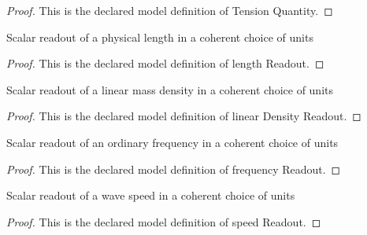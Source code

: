\begin{proof}
  This is the declared model definition of Tension Quantity.
\end{proof}
\begin{definition}
  \label{def:physics:phyx-mini-0182:phyxminiproblems-problemphyxmini0182-lengthreadout}
  Scalar readout of a physical length in a coherent choice of units
\end{definition}
\begin{proof}
  This is the declared model definition of length Readout.
\end{proof}
\begin{definition}
  \label{def:physics:phyx-mini-0182:phyxminiproblems-problemphyxmini0182-lineardensityreadout}
  Scalar readout of a linear mass density in a coherent choice of units
\end{definition}
\begin{proof}
  This is the declared model definition of linear Density Readout.
\end{proof}
\begin{definition}
  \label{def:physics:phyx-mini-0182:phyxminiproblems-problemphyxmini0182-frequencyreadout}
  Scalar readout of an ordinary frequency in a coherent choice of units
\end{definition}
\begin{proof}
  This is the declared model definition of frequency Readout.
\end{proof}
\begin{definition}
  \label{def:physics:phyx-mini-0182:phyxminiproblems-problemphyxmini0182-speedreadout}
  Scalar readout of a wave speed in a coherent choice of units
\end{definition}
\begin{proof}
  This is the declared model definition of speed Readout.
\end{proof}
